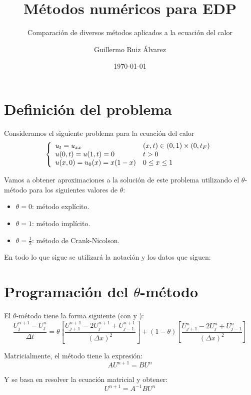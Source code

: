 \documentclass[spanish]{mathnotes}
\title{Métodos numéricos para EDP}
\subtitle{Comparación de diversos métodos aplicados a la ecuación del calor}
\author{Guillermo Ruiz Álvarez}
\date{\today}
\begin{document}
	\makepre
	
	\section{Definición del problema}
	Consideramos el siguiente problema para la ecuación del calor
	\begin{equation*}
	\left\{
		\begin{array}{l l}
			u_t = u_{xx} & (x,t)\in(0,1)\times (0,t_F)\\
			u(0,t) = u(1,t) = 0 & t>0\\
			u(x,0) = u_0(x) = x(1-x) & 0\le x\le 1
		\end{array}
	\right.
	\end{equation*}
	
	Vamos a obtener aproximaciones a la solución de este problema utilizando el $\theta$-método para los siguientes valores de $\theta$:
	\begin{itemize}
		\item $\theta = 0$: método explícito.
		\item $\theta = 1$: método implícito.
		\item $\theta = \frac{1}{2}$: método de Crank-Nicolson.
	\end{itemize}
	
	En todo lo que sigue se utilizará la notación y los datos que siguen:
	\begin{center}
			\hspace{1em}
			\hspace{1em}
	\end{center}
	
	\section{Programación del $\theta$-método}
	El $\theta$-método tiene la forma siguiente (con  y ): 
	$$\frac{U_j^{n+1}-U_j^n}{\Delta t} = 
	\theta \left[\frac{U_{j+1}^{n+1}-2U_{j}^{n+1}+U_{j-1}^{n+1}}{(\Delta x)^2}\right] +
	(1-\theta) \left[ \frac{U_{j+1}^n-2U_j^n+U_{j-1}^n}{(\Delta x)^2}\right]$$
	
	Matricialmente, el método tiene la expresión:
	$$AU^{n+1} = BU^n$$
	
	Y se basa en resolver la ecuación matricial y obtener:
	$$U^{n+1} = A^{-1} B U^n$$
	
\end{document}
